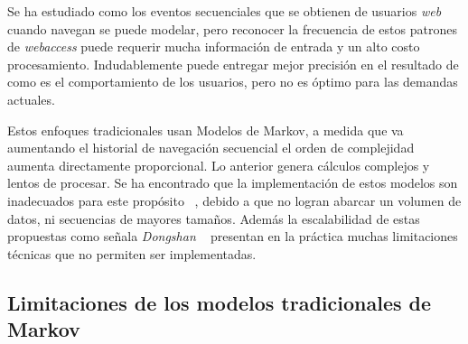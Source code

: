 
%
 


Se ha estudiado como los eventos secuenciales que se obtienen de usuarios \emph{web} cuando navegan se puede modelar, pero reconocer la frecuencia de estos patrones de \emph{webaccess} puede requerir mucha  información de entrada y un alto costo procesamiento.  Indudablemente puede entregar mejor precisión en el resultado de como es el comportamiento de los usuarios, pero no es óptimo para las demandas actuales. 

Estos enfoques tradicionales usan Modelos de Markov, a medida que va aumentando el historial de navegación secuencial el orden de complejidad aumenta directamente proporcional. Lo anterior genera cálculos  complejos y lentos de procesar. Se ha encontrado que la implementación de estos modelos son inadecuados para este propósito~\cite{Dongshan2002} , debido a que no logran abarcar un volumen de datos, ni secuencias de mayores tamaños. Además la escalabilidad de estas propuestas  como señala \emph{Dongshan} \etal~\cite{Dongshan2002} presentan en la práctica muchas limitaciones técnicas que no permiten ser implementadas. 


 








\subsection{Limitaciones de los modelos tradicionales de Markov}





